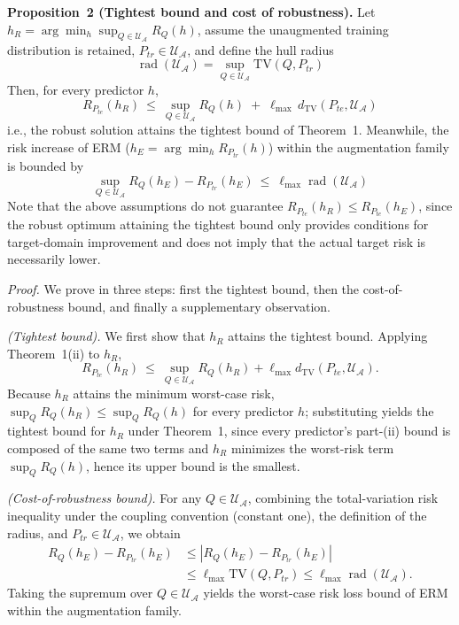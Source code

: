 \documentclass[electronics,article,submit,moreauthors]{Definitions/mdpi}
\begin{document}
\noindent\textbf{Proposition~2 (Tightest bound and cost of robustness).} Let $h_R=\arg\min_h\sup_{Q\in\mathcal{U}_{\mathcal{A}}}R_Q(h)$, assume the unaugmented training distribution is retained, $P_{tr}\in\mathcal{U}_{\mathcal{A}}$, and define the hull radius
\begin{equation}
\operatorname{rad}(\mathcal{U}_{\mathcal{A}})=\sup_{Q\in\mathcal{U}_{\mathcal{A}}}\mathrm{TV}(Q,P_{tr})
\end{equation}
Then, for every predictor $h$,
\begin{equation}
R_{P_{te}}(h_R)\ \leq\ \sup_{Q\in\mathcal{U}_{\mathcal{A}}}R_Q(h)\;+\;\ell_{\max}\,d_{\mathrm{TV}}(P_{te},\mathcal{U}_{\mathcal{A}})
\end{equation}
i.e., the robust solution attains the tightest bound of Theorem~1. Meanwhile, the risk increase of ERM ($h_E=\arg\min_h R_{P_{tr}}(h)$) within the augmentation family is bounded by
\begin{equation}
\sup_{Q\in\mathcal{U}_{\mathcal{A}}}R_Q(h_E)-R_{P_{tr}}(h_E)\ \leq\ \ell_{\max}\operatorname{rad}(\mathcal{U}_{\mathcal{A}})
\end{equation}
Note that the above assumptions do not guarantee $R_{P_{te}}(h_R)\leq R_{P_{te}}(h_E)$, since the robust optimum attaining the tightest bound only provides conditions for target-domain improvement and does not imply that the actual target risk is necessarily lower.

\noindent\textit{Proof.} We prove in three steps: first the tightest bound, then the cost-of-robustness bound, and finally a supplementary observation.

\emph{(Tightest bound).} We first show that $h_R$ attains the tightest bound. Applying Theorem~1(ii) to $h_R$,
\begin{equation}
R_{P_{te}}(h_R)\ \leq\ \sup_{Q\in\mathcal{U}_{\mathcal{A}}}R_Q(h_R)+\ell_{\max}d_{\mathrm{TV}}(P_{te},\mathcal{U}_{\mathcal{A}}).
\end{equation}
Because $h_R$ attains the minimum worst-case risk, $\sup_Q R_Q(h_R)\leq\sup_Q R_Q(h)$ for every predictor $h$; substituting yields the tightest bound for $h_R$ under Theorem~1, since every predictor's part-(ii) bound is composed of the same two terms and $h_R$ minimizes the worst-risk term $\sup_Q R_Q(h)$, hence its upper bound is the smallest.

\emph{(Cost-of-robustness bound).} For any $Q\in\mathcal{U}_{\mathcal{A}}$, combining the total-variation risk inequality under the coupling convention (constant one), the definition of the radius, and $P_{tr}\in\mathcal{U}_{\mathcal{A}}$, we obtain
\begin{equation}
\begin{aligned}
R_Q(h_E)-R_{P_{tr}}(h_E)&\leq |R_Q(h_E)-R_{P_{tr}}(h_E)|\\
&\leq \ell_{\max}\mathrm{TV}(Q,P_{tr})\leq \ell_{\max}\operatorname{rad}(\mathcal{U}_{\mathcal{A}}).
\end{aligned}
\end{equation}
Taking the supremum over $Q\in\mathcal{U}_{\mathcal{A}}$ yields the worst-case risk loss bound of ERM within the augmentation family.
\end{document}
